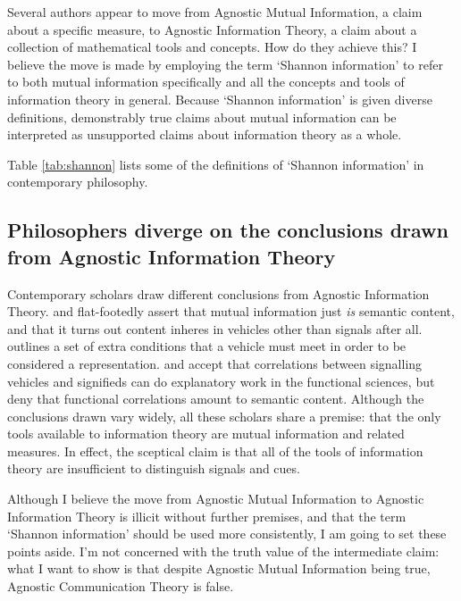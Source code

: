 Several authors appear to move from {\sc Agnostic Mutual Information}, a claim about a specific measure, to {\sc Agnostic Information Theory}, a claim about a collection of mathematical tools and concepts.
How do they achieve this?
I believe the move is made by employing the term `Shannon information' to refer to both mutual information specifically and all the concepts and tools of information theory in general.
Because `Shannon information' is given diverse definitions, demonstrably true claims about mutual information can be interpreted as unsupported claims about information theory as a whole.

Table \ref{tab:shannon} lists some of the definitions of `Shannon information' in contemporary philosophy.



\subsection{\sloppy Philosophers diverge on the conclusions drawn from {\sc Agnostic Information Theory}}

Contemporary scholars draw different conclusions from {\sc Agnostic Information Theory}.
\citet{skyrms2010signals} and \citet{isaac2018semantics} flat-footedly assert that mutual information just \textit{is} semantic content, and that it turns out content inheres in vehicles other than signals after all.
\citet[SECTION]{shea2018representation} outlines a set of extra conditions that a vehicle must meet in order to be considered a representation. 
\citet{lean2014shannon} and \citet[CHAPTER]{hutto2017evolving} accept that correlations between signalling vehicles and signifieds can do explanatory work in the functional sciences, but deny that functional correlations amount to semantic content.
Although the conclusions drawn vary widely, all these scholars share a premise: that the only tools available to information theory are mutual information and related measures.
In effect, the sceptical claim is that all of the tools of information theory are insufficient to distinguish signals and cues.

Although I believe the move from {\sc Agnostic Mutual Information} to {\sc Agnostic Information Theory} is illicit without further premises, and that the term `Shannon information' should be used more consistently, I am going to set these points aside.
I'm not concerned with the truth value of the intermediate claim: what I want to show is that despite {\sc Agnostic Mutual Information} being true, {\sc Agnostic Communication Theory} is false.

